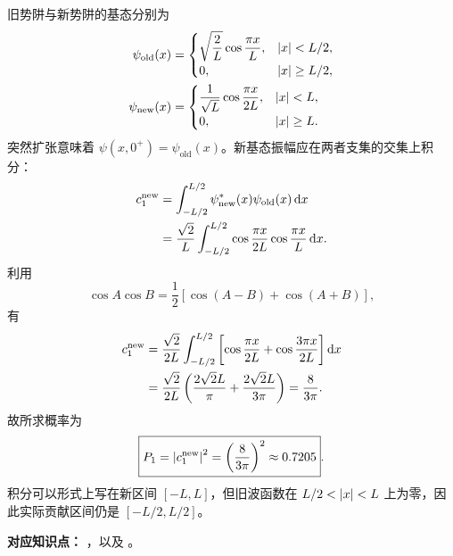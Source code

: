 \begin{checkedsolution}
旧势阱与新势阱的基态分别为
\begin{align}
  \psi_{\mathrm{old}}(x)
  &=\begin{cases}
    \displaystyle\sqrt{\frac2L}\cos\frac{\pi x}{L},
      &\left|x\right|<L/2,\\[4pt]
    0,&\left|x\right|\geq L/2,
  \end{cases}
  \label{eq:QM-C05-S02-E01-old-ground}\\
  \psi_{\mathrm{new}}(x)
  &=\begin{cases}
    \displaystyle\frac1{\sqrt L}\cos\frac{\pi x}{2L},
      &\left|x\right|<L,\\[4pt]
    0,&\left|x\right|\geq L.
  \end{cases}
  \label{eq:QM-C05-S02-E01-new-ground}
\end{align}
突然扩张意味着 $\psi(x,0^+)=\psi_{\mathrm{old}}(x)$。新基态振幅应在两者支集的交集上积分：
\begin{align}
  c_1^{\mathrm{new}}
  &=\int_{-L/2}^{L/2}
  \psi_{\mathrm{new}}^*(x)\psi_{\mathrm{old}}(x)\mathop{}\!\mathrm{d} x
  \notag\\
  &=\frac{\sqrt2}{L}
  \int_{-L/2}^{L/2}
  \cos\frac{\pi x}{2L}\cos\frac{\pi x}{L}\mathop{}\!\mathrm{d} x.
  \label{eq:QM-C05-S02-E01-overlap}
\end{align}
利用
\begin{equation}
  \cos A\cos B
  =\frac12\left[\cos(A-B)+\cos(A+B)\right],
  \label{eq:QM-C05-S02-E01-product-to-sum}
\end{equation}
有
\begin{align}
  c_1^{\mathrm{new}}
  &=\frac{\sqrt2}{2L}
  \int_{-L/2}^{L/2}
  \left[
    \cos\frac{\pi x}{2L}
    +\cos\frac{3\pi x}{2L}
  \right]\mathop{}\!\mathrm{d} x
  \notag\\
  &=\frac{\sqrt2}{2L}
  \left(
    \frac{2\sqrt2L}{\pi}
    +\frac{2\sqrt2L}{3\pi}
  \right)
  =\frac{8}{3\pi}.
  \label{eq:QM-C05-S02-E01-amplitude}
\end{align}
故所求概率为
\begin{equation}
  \boxed{
  P_1=\left|c_1^{\mathrm{new}}\right|^2
  =\left(\frac{8}{3\pi}\right)^2
  \approx0.7205}.
  \label{eq:QM-C05-S02-E01-probability}
\end{equation}
积分可以形式上写在新区间 $[-L,L]$，但旧波函数在 $L/2<\left|x\right|<L$ 上为零，因此实际贡献区间仍是 $[-L/2,L/2]$。
\end{checkedsolution}


\textbf{对应知识点：}
，以及
。

